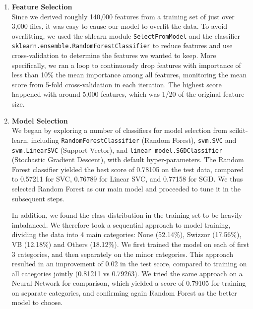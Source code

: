 \documentclass[11pt]{article}
\begin{document}
\begin{enumerate}
\item \textbf{Feature Selection}\\
Since we derived roughly 140,000 features from a training set of just over 3,000 files, it was easy to cause our model to overfit the data. To avoid overfitting, we used the sklearn module \verb|SelectFromModel| and the classifier \verb|sklearn.ensemble.RandomForestClassifier| to reduce features and use cross-validation to determine the features we wanted to keep. More specifically, we ran a loop to continuously drop features with importance of less than 10\% the mean importance among all features, monitoring the mean score from 5-fold cross-validation in each iteration. The highest score happened with around 5,000 features, which was 1/20 of the original feature size.

\item\textbf{Model Selection}\\
We began by exploring a number of classifiers for model selection from scikit-learn, including \verb|RandomForestClassifier| (Random Forest), \verb|svm.SVC| and \verb|svm.LinearSVC| (Support Vector), and \verb|linear_model.SGDClassifier| (Stochastic Gradient Descent), with default hyper-parameters. The Random Forest classifier yielded the best score of 0.78105 on the test data, compared to 0.57211 for SVC, 0.76789 for Linear SVC, and 0.77158 for SGD. We thus selected Random Forest as our main model and proceeded to tune it in the subsequent steps.

In addition, we found the class distribution in the training set to be heavily imbalanced. We therefore took a sequential approach to model training, dividing the data into 4 main categories: None (52.14\%), Swizzor (17.56\%), VB (12.18\%) and Others (18.12\%). We first trained the model on each of first 3 categories, and then separately on the minor categories. This approach resulted in an improvement of 0.02 in the test score, compared to training on all categories jointly (0.81211 vs 0.79263). We tried the same approach on a Neural Network for comparison, which yielded a score of 0.79105 for training on separate categories, and confirming again Random Forest as the better model to choose.


\end{enumerate}
\end{document}
